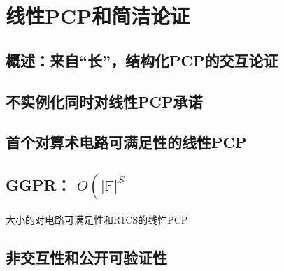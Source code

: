 \chapter{线性PCP和简洁论证}\label{chp:17LPCP}

\section{概述：来自“长”，结构化PCP的交互论证}\label{17.1}
\section{不实例化同时对线性PCP承诺}\label{17.2}
\section{首个对算术电路可满足性的线性PCP}\label{17.3}
\section{GGPR： $O\left(|\mathbb{F}|^S\right.$}大小的对电路可满足性和R1CS的线性PCP\label{17.4}
\section{非交互性和公开可验证性}\label{17.5}
